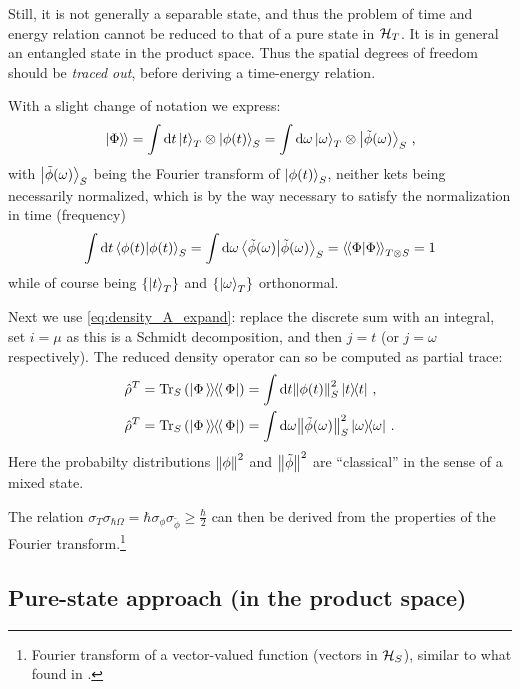 Still, it is not generally
a separable state,
and thus
the problem of time and energy relation cannot be reduced to that of
a pure state in $\mathcal{H}_T$.
It is in general an entangled state in the product space.
Thus the spatial degrees of freedom should be \emph{traced out},
before deriving a time-energy relation.

With a slight change of notation we express:
\begin{equation}
  \left.\left| \Phi \right\rangle\hspace{-0.115em}\right\rangle =
    \int \dd{t} \ket{t}_T \otimes \ket{\phi(t)}_S =
    \int \dd\omega \ket{\omega}_T \otimes \ket{\tilde{\phi}(\omega)}_S \, \text{,}
\end{equation}
with $\ket{\tilde{\phi}(\omega)}_S$ being the Fourier transform
of $\ket{\phi(t)}_S$,
neither kets being necessarily normalized, which is by the way necessary
to satisfy the normalization in time (frequency)
\[
  \int \dd{t} \braket{\phi(t)}_S =
    \int \dd{\omega} \braket{\tilde{\phi}(\omega)}_S =
    \left\langle\hspace{-0.115em}\left\langle \Phi \middle| \Phi \right\rangle\hspace{-0.115em}\right\rangle_{T \otimes S} = 
    1
\]
while of course being $\left\{\ket{t}_T\right\}$ and $\left\{\ket{\omega}_T\right\}$
orthonormal.

Next we use \eqref{eq:density_A_expand}: replace the discrete sum with an integral,
set $i = \mu$ as this is a Schmidt decomposition, and then $j = t$
(or $j = \omega$ respectively).
The reduced density operator can so be computed
as partial trace:
\begin{align}
  \label{eq:ptrace_density_matrix_t}
  \hat{\rho}^T = \Tr_S\qty(\left| \Phi \left\rangle\hspace{-0.115em}\left\rangle \hspace{-0.115em} \right\langle\hspace{-0.115em}\right\langle \Phi \right|) &= \int \dd t \norm{\phi(t)}^2_S \ketbra{t}{t}
    \, \text{,}
  \\
  \label{eq:ptrace_density_matrix_omega}
  \hat{\rho}^T = \Tr_S\qty(\left| \Phi \left\rangle\hspace{-0.115em}\left\rangle \hspace{-0.115em} \right\langle\hspace{-0.115em}\right\langle \Phi \right|) &= \int \dd \omega \norm{\tilde{\phi}(\omega)}^2_S \ketbra{\omega}{\omega}
    \,\text{.} 
\end{align}
Here the probabilty distributions $\norm{\phi}^2$ and $\norm{\tilde{\phi}}^2$
are ``classical'' in the sense of a mixed state.

The relation $\sigma_T\sigma_{\hbar\Omega} = \hbar \sigma_{\phi} \sigma_{\tilde{\phi}} \geq \frac{\hbar}{2}$
can then be derived from the properties of the Fourier transform.\footnote{
  Fourier transform of a
  vector-valued function
  (vectors in $\mathcal{H}_S$),
  similar to what found in \cite{Maccone:Pauli}.
}

\subsection{Pure-state approach (in the product space)}


